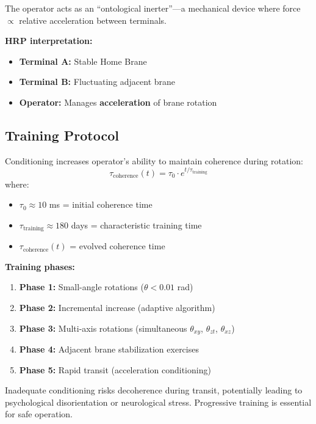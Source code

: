 The operator acts as an ``ontological inerter''---a mechanical device where force $\propto$ relative acceleration between terminals.

\textbf{HRP interpretation:}
\begin{itemize}
\item \textbf{Terminal A:} Stable Home Brane
\item \textbf{Terminal B:} Fluctuating adjacent brane
\item \textbf{Operator:} Manages \textbf{acceleration} of brane rotation
\end{itemize}

\subsection{Training Protocol}

Conditioning increases operator's ability to maintain coherence during rotation:
\begin{equation}
\tau_{\text{coherence}}(t) = \tau_0 \cdot e^{t/\tau_{\text{training}}}
\end{equation}
where:
\begin{itemize}
\item $\tau_0 \approx 10$ ms = initial coherence time
\item $\tau_{\text{training}} \approx 180$ days = characteristic training time
\item $\tau_{\text{coherence}}(t)$ = evolved coherence time
\end{itemize}

\textbf{Training phases:}
\begin{enumerate}
\item \textbf{Phase 1:} Small-angle rotations ($\theta < 0.01$ rad)
\item \textbf{Phase 2:} Incremental increase (adaptive algorithm)
\item \textbf{Phase 3:} Multi-axis rotations (simultaneous $\theta_{xy}$, $\theta_{zt}$, $\theta_{xz}$)
\item \textbf{Phase 4:} Adjacent brane stabilization exercises
\item \textbf{Phase 5:} Rapid transit (acceleration conditioning)
\end{enumerate}

\begin{warningbox}
Inadequate conditioning risks decoherence during transit, potentially leading to psychological disorientation or neurological stress. Progressive training is essential for safe operation.
\end{warningbox}

